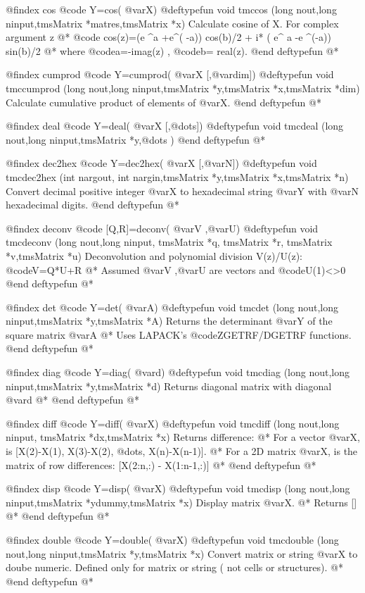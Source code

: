 @findex  cos
@code{  Y=cos( @var{X})}
@deftypefun void  tmccos (long nout,long ninput,tmsMatrix *matres,tmsMatrix *x)
Calculate cosine of X. For complex argument z @*
  @code{ cos(z)=(e ^a +e^( -a)) cos(b)/2  + i* ( e^ a -e ^(-a)) sin(b)/2   } @*
where @code{a=-imag(z)} , @code{b= real(z)}.
@end deftypefun
@*

@findex  cumprod
@code{  Y=cumprod( @var{X} [,@var{dim}])}
@deftypefun void tmccumprod (long nout,long ninput,tmsMatrix *y,tmsMatrix *x,tmsMatrix *dim)
Calculate cumulative product of elements of @var{X}.
@end deftypefun
@*

@findex  deal
@code{  Y=deal( @var{X} [,@dots{}])}
@deftypefun void tmcdeal (long nout,long ninput,tmsMatrix *y,@dots{} )
@end deftypefun
@*

@findex  dec2hex
@code{  Y=dec2hex( @var{X} [,@var{N}])}
@deftypefun void tmcdec2hex (int nargout, int nargin,tmsMatrix *y,tmsMatrix *x,tmsMatrix *n)
Convert decimal positive integer @var{X} to hexadecimal string @var{Y} with @var{N} hexadecimal digits.
@end deftypefun
@*

@findex  deconv
@code{  [Q,R]=deconv( @var{V}  ,@var{U})}
@deftypefun void tmcdeconv (long nout,long ninput, tmsMatrix *q, tmsMatrix *r, tmsMatrix *v,tmsMatrix *u)
Deconvolution and polynomial division V(z)/U(z): @code{V=Q*U+R} @*
Assumed  @var{V}  ,@var{U} are vectors and @code{U(1)<>0}
@end deftypefun
@*

@findex   det
@code{  Y=det( @var{A})}
@deftypefun void tmcdet (long nout,long ninput,tmsMatrix *y,tmsMatrix *A)
Returns the determinant @var{Y}  of the square matrix @var{A} @*
Uses LAPACK's  @code{ZGETRF/DGETRF} functions. 
@end deftypefun
@*

@findex  diag
@code{  Y=diag( @var{d})}
@deftypefun void tmcdiag (long nout,long ninput,tmsMatrix *y,tmsMatrix *d)
Returns diagonal matrix with diagonal  @var{d} @*
@end deftypefun
@*

@findex  diff
@code{  Y=diff( @var{X})}
@deftypefun void tmcdiff (long nout,long ninput, tmsMatrix *dx,tmsMatrix *x)
Returns difference: @*
For a vector @var{X}, is [X(2)-X(1),  X(3)-X(2), @dots{}, X(n)-X(n-1)]. @*
For a 2D matrix @var{X}, is the matrix of row differences:   [X(2:n,:) - X(1:n-1,:)] @*
@end deftypefun
@*

@findex  disp
@code{  Y=disp( @var{X})}
@deftypefun void tmcdisp (long nout,long ninput,tmsMatrix *ydummy,tmsMatrix *x)
Display matrix @var{X}. @*
Returns [] @*
@end deftypefun
@*

@findex double
@code{  Y=double( @var{X})}
@deftypefun void tmcdouble (long nout,long ninput,tmsMatrix *y,tmsMatrix *x)
Convert matrix or string @var{X} to doube numeric. Defined only for matrix or string ( not cells or structures). @*
@end deftypefun
@*

